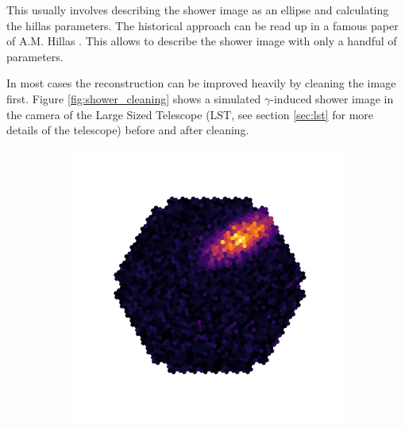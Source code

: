 This usually involves describing the 
shower image as an ellipse and calculating the hillas parameters.
The historical approach can be read up in 
a famous paper of A.M. Hillas \cite{hillas_params}.
This allows to describe the shower image with only a handful of parameters.

In most cases the reconstruction can be improved heavily by cleaning the image first.
Figure \ref{fig:shower_cleaning} shows a simulated $\gamma$-induced shower image
in the camera of the Large Sized Telescope (LST, see section \ref{sec:lst} for more details of the telescope)
before and after cleaning.

\begin{figure}
	\centering
	\begin{subfigure}{.4\textwidth}
  		\centering
  		\includegraphics[width=\linewidth]{Plots/hillas_raw.pdf}
	\end{subfigure}%
	\begin{subfigure}{.4\textwidth}
 		\centering

\end{subfigure}
\end{figure}
